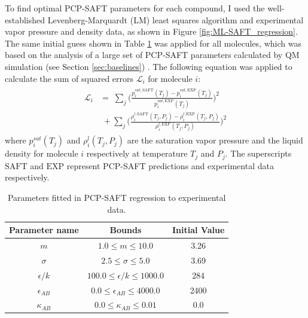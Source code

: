 To find optimal PCP-SAFT parameters for each compound, I used the well-established Levenberg-Marquardt (LM) least squares algorithm and experimental vapor pressure and density data, as shown in Figure \ref{fig:ML-SAFT_regression}. The same initial guess shown in Table \ref{tab:regression_params} was applied for all molecules, which was based on the analysis of a large set of PCP-SAFT parameters calculated by QM simulation (see Section \ref{sec:baselines}) \cite{Kaminski2020}. The following equation was applied to calculate the sum of squared errors $\mathcal{L}_i$ for molecule $i$:
\begin{gather}
\begin{aligned}
    \mathcal{L}_i & = \; \sum_j \biggl(\frac{p_{i}^{sat,\text{SAFT}}(T_j) - p_{i}^{sat,\text{EXP}}(T_j)}{ p_{i}^{sat,\text{EXP}}(T_j)}\biggr)^2 \\
    & \; + \sum_j \biggl(\frac{\rho_{i}^{l,\text{SAFT}}(T_j, P_j) - \rho_{i}^{l,\text{EXP}}(T_j, P_j) }{\rho_{i}^{l,\text{EXP}}(T_j, P_j) }\biggr)^2 
\end{aligned}
\end{gather}
where $p_i^{sat}(T_j)$ and $\rho_{i}^{l}(T_j, P_j)$ are the saturation vapor pressure and the liquid density for molecule $i$ respectively at temperature $T_j$ and $P_j$. The superscripts $\text{SAFT}$ and $\text{EXP}$ represent PCP-SAFT predictions and experimental data respectively. 

\begin{table}
    \centering
    \caption{Parameters fitted in PCP-SAFT regression to experimental data.}
    \label{tab:regression_params}
    \begin{tabular}{ccc}
        Parameter name & Bounds & Initial Value \\
        \hline
        $m$ & $1.0 \leq m \leq 10.0$ & 3.26 \\
        $\sigma$ & $2.5 \leq \sigma \leq 5.0$ & 3.69 \\
        $\epsilon/k$ & $100.0 \leq \epsilon/k \leq 1000.0$ & 284 \\
        $\epsilon_{AB}$ & $0.0 \leq \epsilon_{AB} \leq 4000.0$ & 2400 \\
        $\kappa_{AB}$ & $0.0 \leq \kappa_{AB} \leq 0.01$ & 0.0 \\
        \hline
    \end{tabular}
\end{table}


